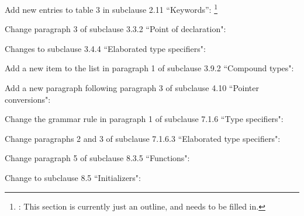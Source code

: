 Add new entries to table 3 in subclause 2.11 ``Keywords'':%
\footnote{:
This section is currently just an outline, and needs to be filled in.
}

Change paragraph 3 of subclause 3.3.2 ``Point of declaration":

Changes to subclause 3.4.4 ``Elaborated type specifiers":

Add a new item to the list in paragraph 1
of subclause 3.9.2 ``Compound types":

Add a new paragraph following paragraph 3
of subclause 4.10 ``Pointer conversions":

Change the grammar rule in paragraph 1 of subclause 7.1.6 ``Type specifiers":

Change paragraphs 2 and 3 of subclause 7.1.6.3 ``Elaborated type specifiers":

Change paragraph 5 of subclause 8.3.5 ``Functions":

Change to subclause 8.5 ``Initializers":
